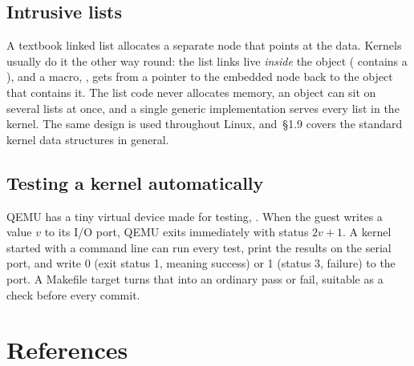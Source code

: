 \documentclass[11pt,a4paper]{article}
\begin{document}
\subsection{Intrusive lists}

A textbook linked list allocates a separate node that points at the data. Kernels usually do it the other way round:
the list links live \emph{inside} the object ( contains a ), and a macro,
, gets from a pointer to the embedded node back to the object that contains it. The list code never
allocates memory, an object can sit on several lists at once, and a single generic implementation serves every list
in the kernel. The same design is used throughout Linux, and \OSC\,\S1.9 covers the standard kernel data structures
in general.

\subsection{Testing a kernel automatically}

QEMU has a tiny virtual device made for testing, . When the guest writes a value $v$ to its I/O
port, QEMU exits immediately with status $2v + 1$. A kernel started with a  command line can run every
test, print the results on the serial port, and write 0 (exit status 1, meaning success) or 1 (status 3, failure) to
the port. A Makefile target turns that into an ordinary pass or fail, suitable as a check before every commit.

\section{References}
\end{document}
